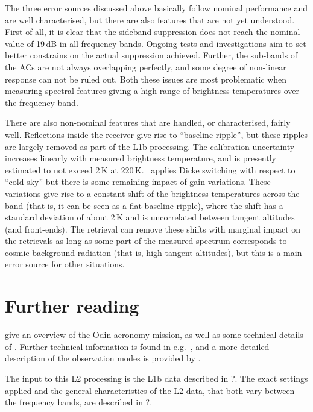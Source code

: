 The three error sources discussed above basically follow nominal performance
and are well characterised, but there are also features that are not yet
understood. First of all, it is clear that the sideband suppression does not
reach the nominal value of 19\,dB in all frequency bands. Ongoing tests and
investigations aim to set better constrains on the actual suppression achieved.
Further, the sub-bands of the ACs are not always overlapping perfectly, and
some degree of non-linear response can not be ruled out. Both these issues are
most problematic when measuring spectral features giving a high range of
brightness temperatures over the frequency band.

There are also non-nominal features that are handled, or characterised, fairly
well. Reflections inside the receiver give rise to ``baseline ripple'', but
these ripples are largely removed as part of the L1b processing. The
calibration uncertainty increases linearly with measured brightness
temperature, and is presently estimated to not exceed 2\,K at 220\,K. \smr\
applies Dicke switching with respect to ``cold sky'' but there is some
remaining impact of gain variations. These variations give rise to a constant
shift of the brightness temperatures across the band (that is, it can be seen
as a flat baseline ripple), where the shift has a standard deviation of about
2\,K and is uncorrelated between tangent altitudes (and front-ends). The
retrieval can remove these shifts with marginal impact on the retrievals as
long as some part of the measured spectrum corresponds to cosmic background
radiation (that is, high tangent altitudes), but this is a main error source
for other situations.



\section{Further reading}
\label{sec:reading}
%
\citep{murtagh:anove:02} give an overview of the Odin aeronomy mission, as well
as some technical details of \smr. Further technical information is found in
e.g.\ \citet{eriksson:studi:02}, and a more detailed description of the
observation modes is provided by \citet{merino:studi:02}.

The input to this L2 processing is the L1b data described in ?\addref. The
exact settings applied and the general characteristics of the L2 data, that
both vary between the frequency bands, are described in ?\addref.





